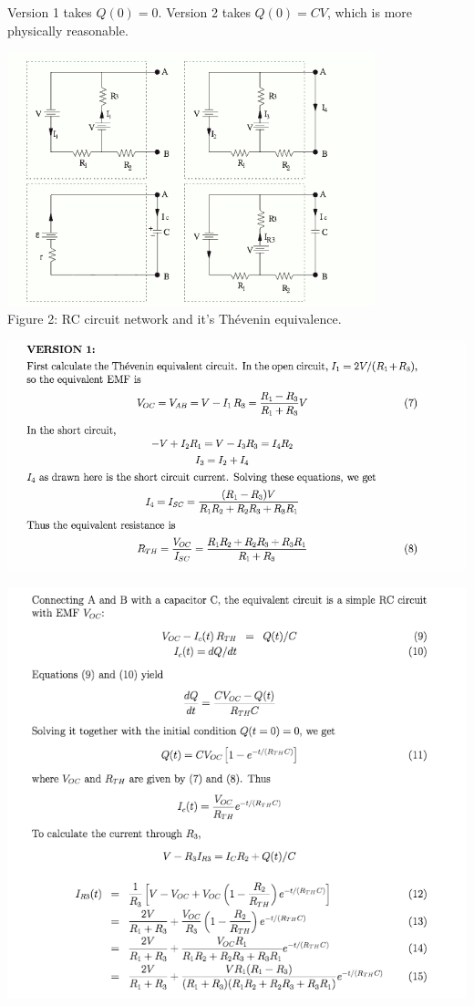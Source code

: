 \documentclass{esg8022pset}
\begin{document}
\begin{solution}
  Version 1 takes $Q(0) = 0$.  Version 2 takes $Q(0) = CV$, which is more physically reasonable.
  \begin{center}
    \includegraphics[width=0.8\textwidth]{ps07_sol_07_1} \\
    Figure 2: RC circuit network and it's Th\'evenin equivalence.
  \end{center}
  \begin{center}\includegraphics[width=\textwidth]{ps07_sol_07_2}\end{center}
  \begin{center}\includegraphics[width=\textwidth]{ps07_sol_07_3}\end{center}

\end{solution}
\end{document}
